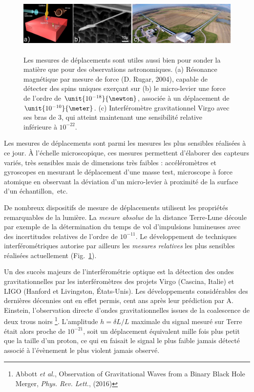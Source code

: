 \documentclass[12pt,a4paper]{article}
\begin{document}
\begin{figure}[b]
\center
\includegraphics[height=90pt]{figures/displacement_small.png}
\caption{Les mesures de déplacements sont utiles aussi bien pour sonder la matière que pour des observations astronomiques.
(a) Résonance magnétique par mesure de force (D. Rugar, 2004), capable de détecter des spins uniques exerçant sur (b) le micro-levier une force de l'ordre de $\unit{10^{-18}}{\newton}$, associée à un déplacement de $\unit{10^{-10}}{\meter}$.
(c) Interféromètre gravitationnel Virgo avec ses bras de \unit{3}{\kilo\meter}, qui atteint maintenant une sensibilité relative inférieure à $10^{-22}$.}
\label{fig:displacement_measurement}
\end{figure}

Les mesures de déplacements sont parmi les mesures les plus sensibles réalisées à ce jour.
À l'échelle microscopique, ces mesures permettent d'élaborer des capteurs variés, très sensibles mais de dimensions très faibles : accéléromètres et gyroscopes en mesurant le déplacement d'une masse test, microscope à force atomique en observant la déviation d'un micro-levier à proximité de la surface d'un échantillon,~etc.
 
De nombreux dispositifs de mesure de déplacements utilisent les propriétés remarquables de la lumière.
La \textit{mesure absolue} de la distance Terre-Lune découle par exemple de la détermination du temps de vol d'impulsions lumineuses avec des incertitudes relatives de l'ordre de $10^{-11}$.
Le développement de techniques interférométriques autorise par ailleurs les \textit{mesures relatives} les plus sensibles réalisées actuellement (Fig.~\ref{fig:displacement_measurement}).

Un des succès majeurs de l'interférométrie optique est la détection des ondes gravitationnelles par les interféromètres des projets Virgo (Cascina, Italie) et LIGO (Hanford et Livingston, États-Unis).
Les développements considérables des dernières décennies ont en effet permis, cent ans après leur prédiction par A. Einstein, l'observation directe d'ondes gravitationnelles issues de la coalescence de deux trous noirs
\footnote{Abbott \textit{et al.}, Observation of Gravitational Waves from a Binary Black Hole Merger, \textit{Phys. Rev. Lett.}, (2016)}.
L'amplitude $h=\delta L/L$ maximale du signal mesuré sur Terre était alors proche de $10^{-21}$, soit un déplacement équivalent mille fois plus petit que la taille d'un proton, ce qui en faisait le signal le plus faible jamais détecté associé à l'évènement le plus violent jamais observé.
\end{document}
